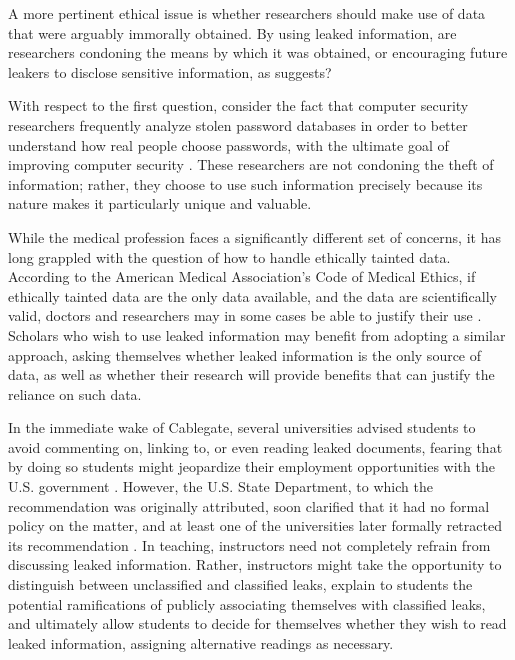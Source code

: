 \documentclass[12pt]{article}
\begin{document}
A more pertinent ethical issue is whether researchers should make use of data that were arguably 
immorally obtained. By using leaked information, are researchers condoning the means by which it was 
obtained, or encouraging future leakers to disclose sensitive information, as \citet{conway2013why} suggests?

With respect to the first question, consider the fact that computer security researchers frequently 
analyze stolen password databases in order to 
better understand how real people choose passwords, with the ultimate goal of improving computer 
security \citep{imperva2010imperva,bbc2013`123456}.
These researchers are not condoning the theft of information; rather, 
they choose to use such information precisely because its nature makes it particularly unique and 
valuable. 

While the medical profession faces a significantly different set of concerns, it has long 
grappled with the question of how to handle ethically tainted data. According to the American Medical Association's 
Code of Medical Ethics, if ethically tainted data are the only data available, and the data are scientifically 
valid, doctors and researchers may in some cases be able to justify their 
use \citep{american_medical_association1998opinion}. Scholars who wish to use leaked information may benefit from adopting a similar approach, asking themselves whether leaked information is the only source of data, as well as whether their research will provide benefits that can justify the reliance on such data. 

In the immediate wake of Cablegate, several universities advised students to avoid commenting on, linking to, 
or even reading leaked documents, 
fearing that by doing so students might jeopardize their employment opportunities with the U.S. 
government \citep{grinberg2010will}. However, the U.S. State Department, to which the recommendation 
was originally attributed, soon clarified that it had no formal policy on the matter, and at least one of the 
universities later formally retracted its recommendation \citep{gustin2010columbia}.
In teaching, instructors need not completely refrain from discussing leaked information. Rather, instructors 
might take the opportunity to distinguish between unclassified and classified leaks, explain to 
students the potential ramifications of publicly associating themselves with classified leaks, and 
ultimately allow students to decide for themselves whether they wish to read leaked information, assigning alternative 
readings as necessary.
\end{document}

